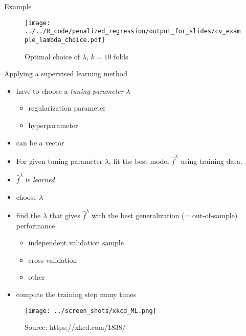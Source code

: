 \documentclass[xcolor=dvipsnames]{beamer}
\begin{document}
\begin{frame}{Example}
  \begin{figure}
  \texttt{[image: ../../R\_code/penalized\_regression/output\_for\_slides/cv\_example\_lambda\_choice.pdf]}
   \caption{Optimal choice of $\lambda$, $k = 10$ folds}
\end{figure}
\end{frame}

\begin{frame}{Applying a supervised learning method}
\begin{itemize}
  \item have to choose a \emph{tuning parameter} $\lambda$
  \begin{itemize}
    \item regularization parameter
    \item hyperparameter
  \end{itemize}
  \item can be a vector
\end{itemize}
\pause 
\begin{description}[<+->]
  \item[Training the model] 
  \begin{itemize}
    \item 
    For given tuning parameter $\lambda$, fit the best model $\hat{f}^{\lambda}$ using training data.
    \item 
    $\hat{f}^{\lambda}$ is \emph{learned}
  \end{itemize}
  \item[Hyperparameter optimization] 
  \begin{itemize}
    \item choose $\lambda$
    \item find the $\lambda$ that gives $\hat{f}^{\lambda}$ with the best generalization (= out-of-sample) performance
    \begin{itemize}
      \item independent validation sample 
      \item cross-validation 
      \item other 
    \end{itemize}
    \item compute the training step many times
  \end{itemize}
\end{description}
\end{frame}

\begin{frame}
\begin{figure}
  \texttt{[image: ../screen\_shots/xkcd\_ML.png]}
   \caption{Source: https://xkcd.com/1838/}
\end{figure}
\end{frame}
\end{document}
